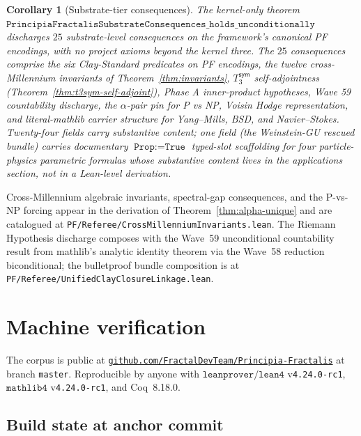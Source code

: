 \documentclass[11pt,a4paper]{amsart}
\theoremstyle{plain}
\newtheorem{corollary}[theorem]{Corollary}
\theoremstyle{definition}
\newcommand{\Tsym}{T_3^{\textsf{sym}}}
\begin{document}
\begin{corollary}[Substrate-tier consequences]\label{cor:substrate-tier}
The kernel-only theorem $\texttt{PrincipiaFractalisSubstrateConsequences\_holds\_unconditionally}$ discharges $25$ substrate-level consequences on the framework's canonical PF encodings, with no project axioms beyond the kernel three. The $25$ consequences comprise the six Clay-Standard predicates on PF encodings, the twelve cross-Millennium invariants of Theorem~\ref{thm:invariants}, $\Tsym$ self-adjointness (Theorem~\ref{thm:t3sym-self-adjoint}), Phase A inner-product hypotheses, Wave 59 countability discharge, the $\alpha$-pair pin for P vs NP, Voisin Hodge representation, and literal-mathlib carrier structure for Yang--Mills, BSD, and Navier--Stokes. Twenty-four fields carry substantive content; one field (the Weinstein-GU rescued bundle) carries documentary $\texttt{Prop} := \texttt{True}$ typed-slot scaffolding for four particle-physics parametric formulas whose substantive content lives in the applications section, not in a Lean-level derivation.
\end{corollary}

Cross-Millennium algebraic invariants, spectral-gap consequences, and the P-vs-NP forcing appear in the derivation of Theorem~\ref{thm:alpha-unique} and are catalogued at \texttt{PF/Referee/CrossMillenniumInvariants.lean}. The Riemann Hypothesis discharge composes with the Wave~59 unconditional countability result from mathlib's analytic identity theorem via the Wave~58 reduction biconditional; the bulletproof bundle composition is at \texttt{PF/Referee/UnifiedClayClosureLinkage.lean}.

\section{Machine verification}\label{sec:machine-verification}

The corpus is public at \href{https://github.com/FractalDevTeam/Principia-Fractalis}{\texttt{github.com/FractalDevTeam/Principia-Fractalis}} at branch \texttt{master}. Reproducible by anyone with $\texttt{leanprover/lean4}$ v\texttt{4.24.0-rc1}, $\texttt{mathlib4}$ v\texttt{4.24.0-rc1}, and Coq~8.18.0.

\subsection{Build state at anchor commit}
\end{document}
